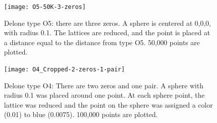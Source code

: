 \documentclass[preprint]{iucr}              %
\begin{document}
\begin{figure}
	\caption{Delone type O5: there are three zeros. A sphere 
		is centered at 0,0,0, with radius 0.1. The lattices are 
		reduced, and the point is 
		placed at a distance equal to the distance from type O5. 50,000
		points are plotted.}
	\label{fig:O5}
	\texttt{[image: O5-50K-3-zeros]}
\end{figure}

\begin{figure}
	\caption{Delone type O4: There are two zeros and one pair.
	A sphere with radius 0.1 was placed around one point. At each
sphere point, the lattice was reduced and the point on the sphere
was assigned a color (0.01) to blue (0.0075). 100,000 points are plotted.}
	\label{fig:O4}
	\texttt{[image: O4\_Cropped-2-zeros-1-pair]}
\end{figure}
\end{document}
